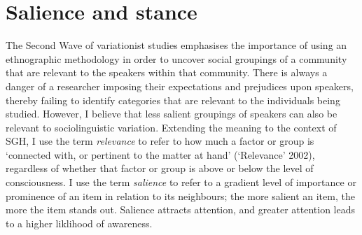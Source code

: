 \section{Salience and stance}\label{sec:salience}
The Second Wave of variationist studies emphasises the importance of using an ethnographic methodology in order to uncover social groupings of a community that are relevant to the speakers within that community.  There is always a danger of a researcher imposing their expectations and prejudices upon speakers, thereby failing to identify categories that are relevant to the individuals being studied.  However, I believe that less salient groupings of speakers can also be relevant to sociolinguistic variation.  Extending the meaning to the context of SGH, I use the term \textit{relevance} to refer to how much a factor or group is `connected with, or pertinent to the matter at hand' (`Relevance' 2002), regardless of whether that factor or group is above or below the level of consciousness.  I use the term \textit{salience} to refer to a gradient level of importance or prominence of an item in relation to its neighbours; the more salient an item, the more the item stands out.  Salience attracts attention, and greater attention leads to a higher liklihood of awareness.


